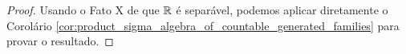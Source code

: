 \begin{proof}
    Usando o Fato X de que $\mathbb{R}$ é separável, podemos aplicar diretamente o Corolário \ref{cor:product_sigma_algebra_of_countable_generated_families} para provar o resultado.
\end{proof}